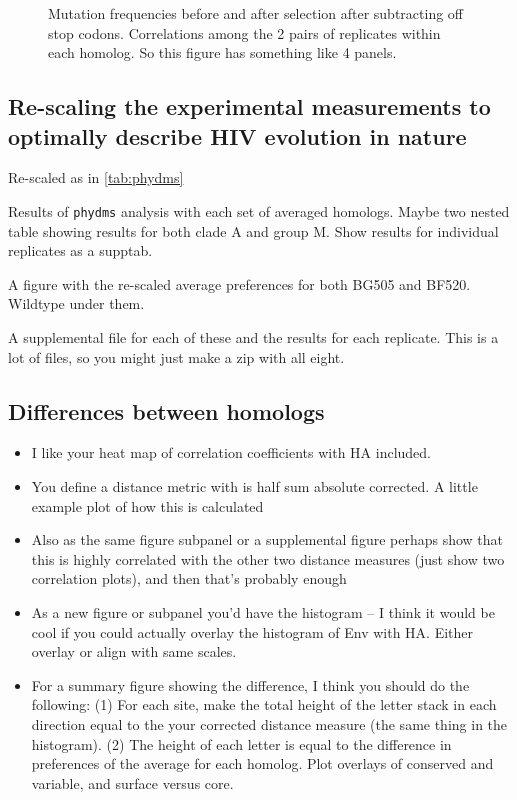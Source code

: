 \documentclass[12pt]{article}
\begin{document}
\begin{figure}
\caption{\label{fig:mutfreqs}
Mutation frequencies before and after selection after subtracting off stop codons.
Correlations among the 2 pairs of replicates within each homolog.
So this figure has something like 4 panels.
}
\end{figure}

\subsection*{Re-scaling the experimental measurements to optimally describe HIV evolution in nature}

Re-scaled as in \ref{tab:phydms}

\begin{table}
\caption{\label{tab:phydms}
Results of \texttt{phydms} analysis with each set of averaged homologs.
Maybe two nested table showing results for both clade A and group M.
Show results for individual replicates as a supptab.
}
\end{table}

A figure with the re-scaled average preferences for both BG505 and BF520. Wildtype under them.

A supplemental file for each of these and the results for each replicate. This is a lot of files, so you might just make a zip with all eight.

\subsection*{Differences between homologs}

\begin{itemize}
\item I like your heat map of correlation coefficients with HA included.
\item You define a distance metric with is half sum absolute corrected. A little example plot of how this is calculated
\item Also as the same figure subpanel or a supplemental figure perhaps show that this is highly correlated with the other two distance measures (just show two correlation plots), and then that's probably enough
\item As a new figure or subpanel you'd have the histogram -- I think it would be cool if you could actually overlay the histogram of Env with HA. Either overlay or align with same scales. 
\item For a summary figure showing the difference, I think you should do the following: (1) For each site, make the total height of the letter stack in each direction equal to the your corrected distance measure (the same thing in the histogram). (2) The height of each letter is equal to the difference in preferences of the average for each homolog. Plot overlays of conserved and variable, and surface versus core.
\end{itemize}
\end{document}
